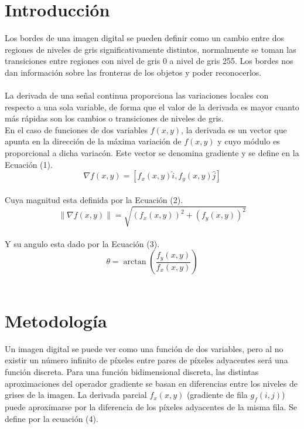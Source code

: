 \documentclass[conference]{IEEEtran}
\begin{document}
\section{Introducci\'on} 
Los bordes de una imagen digital se pueden definir como un cambio entre dos regiones de niveles de gris significativamente distintos, normalmente se toman las transiciones entre regiones con nivel de gris 0 a nivel de gris 255. Los bordes nos dan informaci\'on sobre las fronteras de los objetos y poder reconocerlos.\\\\
La derivada de una se\~nal continua proporciona las variaciones locales con respecto a una sola variable, de forma que el valor de la derivada es mayor cuanto m\'as r\'apidas son los cambios o transiciones de niveles de gris.\\
En el caso de funciones de dos variables $f(x,y)$, la derivada es un vector que apunta en la direcci\'on de la m\'axima variaci\'on de $f(x,y)$ y cuyo m\'odulo es proporcional a dicha variac\'on. Este vector se denomina gradiente y se define en la Ecuaci\'on (1).\\
\begin{equation}
	\nabla f(x,y) = \left[ f_{x}(x,y) \hat{i}, f_{y}(x,y)\hat{j} \right]
\end{equation}
\\
Cuya magnitud esta definida por la Ecuaci\'on (2).\\
\begin{equation}
	\parallel \nabla f(x,y) \parallel = \sqrt{ \left( f_{x}(x,y) \right) ^2 + \left( f_{y}(x,y) \right)^2 } 
\end{equation}
\\ Y su angulo esta dado por la Ecuaci\'on (3).\\
\begin{equation}
	\theta = \arctan\left(  \frac{f_{y}(x,y)}{f_{x}(x,y)} \right)
\end{equation}
\\

\section{Metodolog\'ia}
Un imagen digital se puede ver como una funci\'on de dos variables, pero al no existir un n\'umero infinito de p\'ixeles entre pares de p\'ixeles adyacentes ser\'a una funci\'on discreta. Para una funci\'on bidimensional discreta, las distintas aproximaciones del operador gradiente se basan en diferencias entre los niveles de grises de la imagen. La derivada parcial $f_{x}(x,y)$ (gradiente de fila $g_{f}(i,j)$) puede aproximarse por la diferencia de los p\'ixeles adyacentes de la misma fila. Se define por la ecuaci\'on (4).
\end{document}
